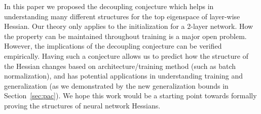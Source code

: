 \label{sec:conclusion}
In this paper we proposed the decoupling conjecture which helps in understanding many different structures for the top eigenspace of layer-wise Hessian. Our theory only applies to the initialization for a 2-layer network. How the property can be maintained throughout training is a major open problem. %
However, the implications of the decoupling conjecture can be verified empirically. Having such a conjecture allows us to predict how the structure of the Hessian changes based on architecture/training method (such as batch normalization), and has potential applications in understanding training and generalization (as we demonstrated by the new generalization bounds in Section~\ref{sec:pac}). We hope this work would be a starting point towards formally proving the structures of neural network Hessians.


